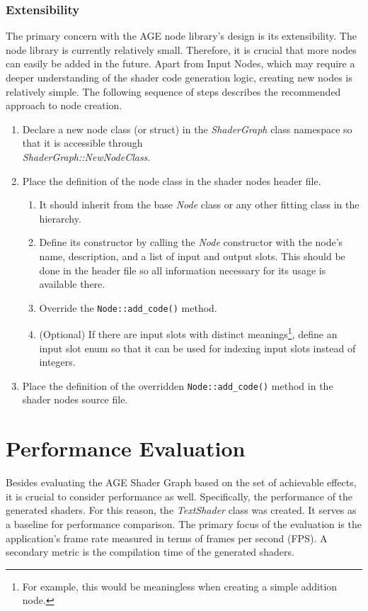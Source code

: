 \documentclass[
  digital,     %
  oneside,     %
  nosansbold,  %
  nocolorbold, %
  lof,         %
  lot,         %
]{fithesis4}
\begin{document}
\subsection{Extensibility}\label{sec:extensibility}
The primary concern with the AGE node library's design is its extensibility.
The node library is currently relatively small. Therefore, it is crucial that more nodes
can easily be added in the future. Apart from Input Nodes, which may require a deeper
understanding of the shader code generation logic, creating new nodes is relatively
simple. The following sequence of steps describes the recommended approach
to node creation.
\begin{enumerate}
    \item Declare a new node class (or struct) in the \textit{ShaderGraph} class namespace
    so that it is accessible through \\\textit{ShaderGraph::NewNodeClass}.
    \item Place the definition of the node class in the shader nodes header file.
    \begin{enumerate}
        \item[2.1.] It should inherit from the base \textit{Node} class or any other
        fitting class in the hierarchy.
        \item[2.2.] Define its constructor by calling the \textit{Node} constructor
        with the node's name, description, and a list of input and output slots.
        This should be done in the header file so all information
        necessary for its usage is available there.
        \item[2.3.] Override the \verb|Node::add_code()| method.
        \item[2.4.] (Optional) If there are input slots
        with distinct meanings\footnote{For example, this would be meaningless
        when creating a simple addition node.}, define an input slot enum
        so that it can be used for indexing input slots instead of integers.
    \end{enumerate}
    \item Place the definition of the overridden \verb|Node::add_code()| method
    in the shader nodes source file.
\end{enumerate}

\chapter{Performance Evaluation}\label{chap:performance-evaluation}
Besides evaluating the AGE Shader Graph based on the set of achievable effects,
it is crucial to consider performance as well. Specifically, the performance of the
generated shaders. For this reason, the \textit{TextShader} class was created.
It serves as a baseline for performance comparison. The primary focus of the evaluation
is the application's frame rate measured in terms of frames per second (FPS).
A secondary metric is the compilation time of the generated shaders.
\end{document}
